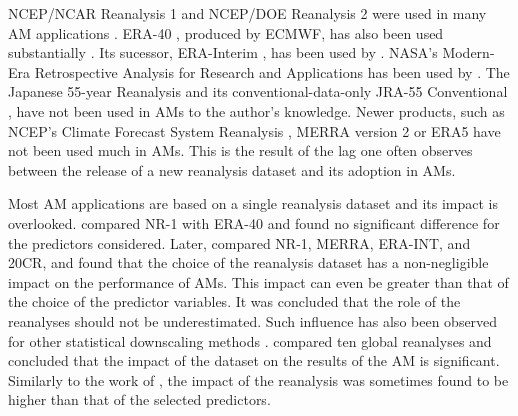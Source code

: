 \documentclass[alpha-refs]{wiley-article}
\begin{document}
NCEP/NCAR Reanalysis 1 \citep[NR-1 --][]{Kalnay1996, Kistler2001} and NCEP/DOE Reanalysis 2 \citep[NR-2 --][]{Kanamitsu2002} were used in many AM applications \citep[e.g.][]{Timbal2003, Altava-Ortiz2006, Matulla2007, Yiou2014}. ERA-40 \citep{Uppala2005}, produced by ECMWF, has also been used substantially \citep[e.g.][] {Willems2011b, Radanovics2013, Chardon2014, BenDaoud2016}. Its sucessor, ERA-Interim \citep[ERA-INT --][]{Dee2011a}, has been used by \cite{Raynaud2016b}. NASA's Modern-Era Retrospective Analysis for Research and Applications \citep[MERRA -- ][]{Rienecker2011} has been used by \citet{Vanvyve2015}. The Japanese 55-year Reanalysis \citep[JRA-55 --][]{Kobayashi2015, Harada2016} and its conventional-data-only JRA-55 Conventional \citep[JRA-55C --][]{Kobayashi2014}, have not been used in AMs to the author’s knowledge. Newer products, such as NCEP's Climate Forecast System Reanalysis \citep[CFSR --][]{Saha2010a}, MERRA version 2 \citep[MERRA-2 -- ][]{Gelaro2017} or ERA5 \citep{Hersbach2020} have not been used much in AMs. This is the result of the lag one often observes between the release of a new reanalysis dataset and its adoption in AMs.

Most AM applications are based on a single reanalysis dataset and its impact is overlooked. \citet{BenDaoud2009} compared NR-1 with ERA-40 and found no significant difference for the predictors considered. Later, \citet{Dayon2015} compared NR-1, MERRA, ERA-INT, and 20CR, and found that the choice of the reanalysis dataset has a non-negligible impact on the performance of AMs. This impact can even be greater than that of the choice of the predictor variables. It was concluded that the role of the reanalyses should not be underestimated. Such influence has also been observed for other statistical downscaling methods \citep[e.g.][]{Koukidis2009}. \citet{Horton2018b} compared ten global reanalyses and concluded that the impact of the dataset on the results of the AM is significant. Similarly to the work of \citet{Dayon2015}, the impact of the reanalysis was sometimes found to be higher than that of the selected predictors. 
\end{document}
